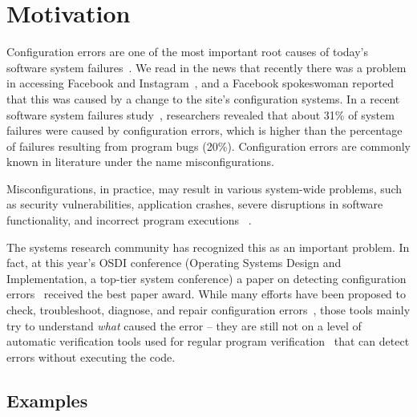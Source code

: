 \section{Motivation}
\label{sec:intro}

Configuration errors are one of the most important root causes of
today's software system failures~\cite{xu15systems, yin11anempirical}.
We read in the news that recently there was a problem in accessing  
Facebook and Instagram~\cite{mashableNews}, 
and a Facebook spokeswoman reported that 
this was caused by a change to the site's configuration systems.
In a recent software system failures study~\cite{yin11anempirical},
researchers revealed that about 31\% of system failures were caused by 
configuration errors, which is higher than the percentage of
failures resulting from program bugs (20\%). 
Configuration errors are commonly known in literature 
under the name misconfigurations. 

Misconfigurations, in practice, may result in various
system-wide problems, such as security vulnerabilities, 
application crashes, severe disruptions in software
functionality, and incorrect program executions%
~\cite{zhang14encore, yuan11context, xu13do, xu15hey}. 

The systems research community has recognized this as an important
problem. In fact, at this year's OSDI conference (Operating Systems
Design and Implementation, a top-tier system conference) a paper on
detecting configuration errors~\cite{xu16early} received the best paper 
award. While many efforts have been proposed to check, troubleshoot, diagnose, and repair configuration errors~\cite{attariyan10automating,
su07autobash, whitaker04configuration},
those tools mainly try to understand {\emph{what}} caused the 
error -- they are still not on a level of
automatic verification tools used for regular program 
verification~\cite{Leino10Dafny, PiskacWZ14, BobotFMP15} that can
detect errors without executing the code.

\subsection{Examples}
\label{sec:intro-examples}

